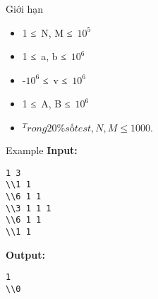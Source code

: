 Giới hạn
\begin{itemize}
	\item     1 ≤ N, M ≤ $10^{5}$
	\item     1 ≤ a, b ≤ $10^{6}$
	\item     -$10^{6}$    ≤ v ≤ $10^{6}$
	\item     1 ≤ A, B ≤ $10^{6}$
	\item $^     Trong 20\% số test, N, M ≤ 1000.    $
\end{itemize}
Example
\textbf{    Input:   }
\begin{verbatim}
1 3
\\1 1
\\6 1 1 
\\3 1 1 1 
\\6 1 1
\\1 1\end{verbatim}

\textbf{    Output:   }
\begin{verbatim}
1
\\0\end{verbatim}